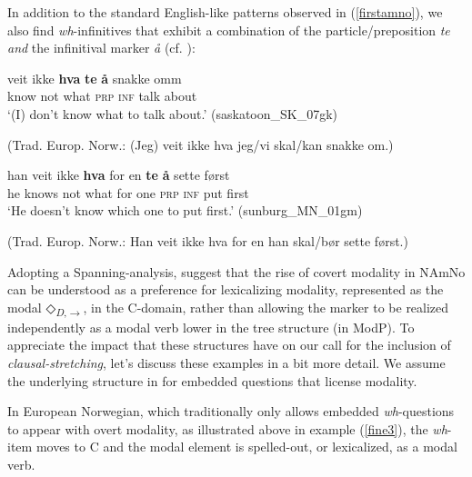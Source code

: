 \documentclass[output=paper,colorlinks,citecolor=brown]{langscibook}
\begin{document}
In addition to the standard English-like patterns observed in (\ref{firstamno}), we also find \textit{wh}-infinitives that exhibit a combination of the particle\slash preposition \textit{te} \emph{and} the infinitival marker \textit{{\aa}} (cf. \citealp{putsoft}): 


\begin{exe} 

\item \label{CANSexm} 

\begin{xlist} 

\item \gll veit ikke \textbf{hva} \textbf{te} \textbf{{\aa}} snakke omm \\
        know not what \textsc{prp} \textsc{inf} talk about \\
         \glt `(I) don't know what to talk about.' \hfill(saskatoon\_SK\_07gk)
         
         (Trad. Europ. Norw.: (Jeg) veit ikke hva jeg/vi skal/kan snakke om.)


\item \label{CANSexh} \gll han veit ikke \textbf{hva} for en \textbf{te} \textbf{{\aa}} sette først \\
        he knows not what for one \textsc{prp} \textsc{inf} put first \\
         \glt `He doesn't know which one to put first.' \hfill(sunburg\_MN\_01gm)
         
         (Trad. Europ. Norw.: Han veit ikke hva for en han skal/b{\o}r sette f{\o}rst.)

\end{xlist}
         
\end{exe}

Adopting a Spanning-analysis, \citet{putsoft23} suggest that the rise of covert modality in NAmNo can be understood as a preference for lexicalizing modality, represented as the modal ◇\textsubscript{\textit{D},$\rightarrow$}, in the C-domain, rather than allowing the marker to be realized independently as a modal verb lower in the tree structure (in ModP). To appreciate the impact that these structures have on our call for the inclusion of \textit{clausal-stretching}, let's discuss these examples in a bit more detail. We assume the underlying structure in  for embedded questions that license modality. 

In European Norwegian, which traditionally only allows embedded \textit{wh}\hyp questions to appear with overt modality, as illustrated above in example (\ref{fine3}), the \textit{wh}-item moves to C and the modal element is spelled-out, or lexicalized, as a modal verb.
\end{document}
